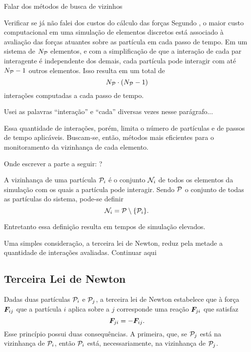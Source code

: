 \alert{Falar dos métodos de busca de vizinhos}

\alert{Verificar se já não falei dos custos do cálculo das forças} Segundo , o maior custo computacional em uma simulação de elementos discretos está associado à avaliação das forças atuantes sobre as partícula em cada passo de tempo. Em um sistema de \(N_{\mathcal{P}}\) elementos, e com a simplificação de que a interação de cada par interagente é independente dos demais, cada partícula pode interagir com até \(N_{\mathcal{P}}-1\) outros elementos. Isso resulta em um total de
\begin{equation*}
	\numberOfParticles\cdot\pqty{\numberOfParticles-1}
\end{equation*}
interações computadas a cada passo de tempo.

\alert{Usei as palavras ``interação'' e ``cada'' diversas vezes nesse parágrafo...}

Essa quantidade de interações, porém, limita o número de partículas e de passos de tempo aplicáveis. Buscam-se, então, métodos mais eficientes para o monitoramento da vizinhança de cada elemento. 

\alert{Onde escrever a parte a seguir: ?}

A vizinhança de uma partícula \(\particlei\) é o conjunto \({\mathcal{N}}_{i}\) de todos os elementos da simulação com os quais a partícula pode interagir. Sendo \(\mathcal{P}\) o conjunto de todas as partículas do sistema, pode-se definir
\begin{equation*}
	\neighborhoodi = \particleSet \setminus \Bqty{\particlei}.
\end{equation*}

Entretanto essa definição resulta em tempos de simulação elevados.

Uma simples consideração, a terceira lei de Newton, reduz pela metade a quantidade de interações avaliadas. \alert{Continuar aqui}

\subsection{Terceira Lei de Newton}

Dadas duas partículas \(\particlei\) e \(\particlej\), a terceira lei de Newton estabelece que à força \({\bm{F}}_{i j}\) que a partícula \(i\) aplica sobre a \(j\) corresponde uma reação \({\bm{F}}_{j i}\) que satisfaz
\begin{equation*}
	{\bm{F}}_{j i} = -{\bm{F}}_{i j}.
\end{equation*}
Esse princípio possui duas consequências. A primeira, que, se \(\particlej\) está na vizinhança de \(\particlei\), então \(\particlei\) está, necessariamente, na vizinhança de \(\particlej\).

